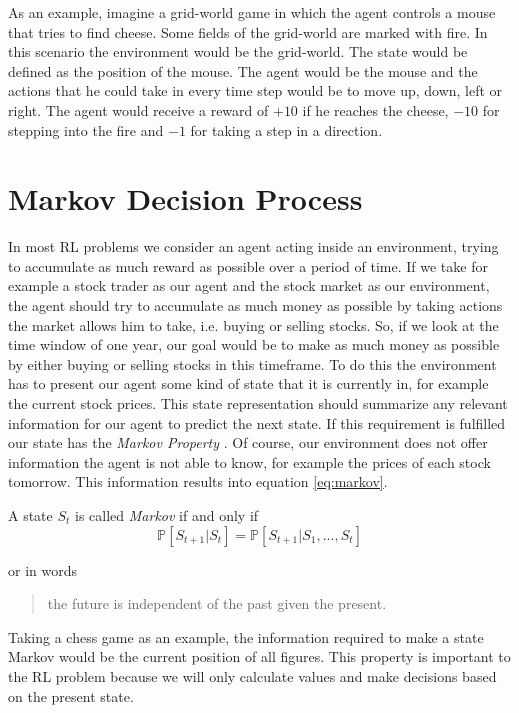 As an example, imagine a grid-world game in which the agent controls a mouse that tries to find cheese.
Some fields of the grid-world are marked with fire.
In this scenario the environment would be the grid-world. The state would be defined as the position of the mouse.
The agent would be the mouse and the actions that he could take in every time step would be to move up, down, left or right.
The agent would receive a reward of $+10$ if he reaches the cheese, $-10$ for stepping into the fire and $-1$ for taking a step in a direction.


\section{Markov Decision Process}

In most RL problems we consider an agent acting inside an environment, trying to accumulate as much reward as possible over a period of time.
If we take for example a stock trader as our agent and the stock market as our environment, the agent should try to accumulate as much money as possible by taking actions the market allows him to take, i.e. buying or selling stocks.
So, if we look at the time window of one year, our goal would be to make as much money as possible by either buying or selling stocks in this timeframe.
To do this the environment has to present our agent some kind of state that it is currently in, for example the current stock prices.
This state representation should summarize any relevant information for our agent to predict the next state.
If this requirement is fulfilled our state has the \emph{Markov Property} \cite{sutton}.
Of course, our environment does not offer information the agent is not able to know, for example the prices of each stock tomorrow.
This information results into equation \ref{eq:markov}.

\begin{defn}[Markov]
A state $S_t$ is called \emph{Markov} if and only if
\begin{equation} \label{eq:markov}
	\mathbb{P}[S_{t+1} | S_{t}] = \mathbb{P}[S_{t+1} | S_{1}, ..., S_{t}]
\end{equation}
\end{defn}
or in words \blockquote[{\cite[1]{lecture_mdp}}]{the future is independent of the past given the present.}

Taking a chess game as an example, the information required to make a state Markov would be the current position of all figures.
This property is important to the RL problem because we will only calculate values and make decisions based on the present state.


